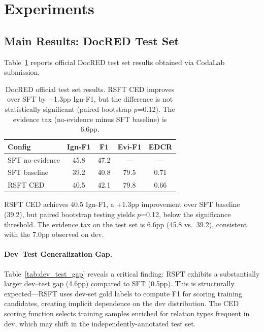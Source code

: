 \documentclass[11pt,a4paper]{article}
\newcommand{\ced}{CED}
\begin{document}
\section{Experiments}
\label{sec:experiments}

\subsection{Main Results: DocRED Test Set}
\label{sec:test_results}

Table~\ref{tab:test_main} reports official DocRED test set results obtained via CodaLab submission.

\begin{table}[t]
\centering
\small
\begin{tabular}{lcccc}
\toprule
\textbf{Config} & \textbf{Ign-F1} & \textbf{F1} & \textbf{Evi-F1} & \textbf{EDCR} \\
\midrule
SFT no-evidence & 45.8 & 47.2 & --- & --- \\
SFT baseline & 39.2 & 40.8 & 79.5 & 0.71 \\
RSFT \ced{} & 40.5 & 42.1 & 79.8 & 0.66 \\
\bottomrule
\end{tabular}
\caption{DocRED official test set results. RSFT \ced{} improves over SFT by +1.3pp Ign-F1, but the difference is not statistically significant (paired bootstrap $p$=0.12). The evidence tax (no-evidence minus SFT baseline) is 6.6pp.}
\label{tab:test_main}
\end{table}

RSFT \ced{} achieves 40.5 Ign-F1, a +1.3pp improvement over SFT baseline (39.2), but paired bootstrap testing yields $p$=0.12, below the significance threshold.
The evidence tax on the test set is 6.6pp (45.8 vs.\ 39.2), consistent with the 7.0pp observed on dev.

\paragraph{Dev--Test Generalization Gap.}
Table~\ref{tab:dev_test_gap} reveals a critical finding: RSFT exhibits a substantially larger dev--test gap (4.6pp) compared to SFT (0.5pp).
This is structurally expected---RSFT uses dev-set gold labels to compute F1 for scoring training candidates, creating implicit dependence on the dev distribution.
The CED scoring function selects training samples enriched for relation types frequent in dev, which may shift in the independently-annotated test set.
\end{document}
